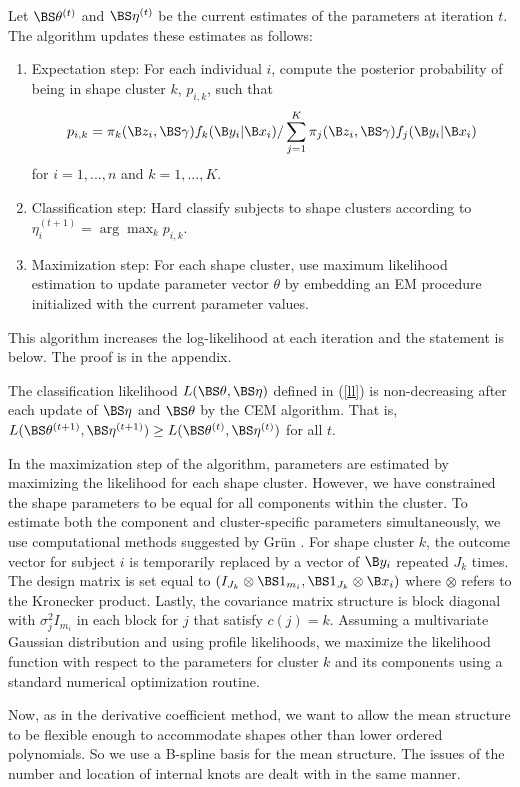 Let $\BS\theta^{(t)}$ and $\BS\eta^{(t)}$ be the current estimates of the parameters at iteration $t$. The algorithm updates these estimates as follows:
\begin{enumerate}
\item Expectation step: For each individual $i$, compute the posterior probability of being in shape cluster $k$, $p_{i,k}$, such that
$$p_{i,k}= \pi_{k}(\B z_{i},\BS\gamma)f_{k}(\B y_{i}|\B x_{i})/\sum^{K}_{j=1} \pi_{j}(\B z_{i},\BS\gamma)f_{j}(\B y_{i}|\B x_{i})$$
for $i=1,...,n$ and $k=1,...,K$.
\item Classification step: Hard classify subjects to shape clusters according to $\eta^{(t+1)}_{i} = \arg\max_{k} p_{i,k}$.
\item Maximization step: For each shape cluster, use maximum likelihood estimation to update parameter vector $\theta$ by embedding an EM procedure initialized with the current parameter values.
\end{enumerate} 
This algorithm increases the log-likelihood at each iteration and the statement is below. The proof is in the appendix. 
\begin{theorem} The classification likelihood $L(\BS\theta,\BS\eta)$ defined in (\ref{ll}) is non-decreasing after each update of $\BS\eta$ and $\BS\theta$ by the CEM algorithm. That is, $L(\BS\theta^{(t+1)},\BS\eta^{(t+1)}) \geq L(\BS\theta^{(t)},\BS\eta^{(t)})$ for all $t$.
\end{theorem}

In the maximization step of the algorithm, parameters are estimated by maximizing the likelihood for each shape cluster. However, we have constrained the shape parameters to be equal for all components within the cluster. To estimate both the component and cluster-specific parameters simultaneously, we use computational methods suggested by Gr{\"u}n \cite{grun2008}. For shape cluster $k$, the outcome vector for subject $i$ is temporarily replaced by a vector of $\B y_{i}$ repeated $J_{k}$ times. The design matrix  is set equal to $(I_{J_{k}}\otimes \BS 1_{m_{i}}, \BS 1_{J_{k}} \otimes \B x_{i})$ where $\otimes$ refers to the Kronecker product. Lastly, the covariance matrix structure is block diagonal with $\sigma^{2}_{j}I_{m_{i}}$ in each block for $j$ that satisfy $c(j)=k$. Assuming a multivariate Gaussian distribution and using profile likelihoods, we maximize the likelihood function with respect to the parameters for cluster $k$ and its components using a standard numerical optimization routine.

Now, as in the derivative coefficient method, we want to allow the mean structure to be flexible enough to accommodate shapes other than lower ordered polynomials. So we use a B-spline basis for the mean structure. The issues of the number and location of internal knots are dealt with in the same manner.

